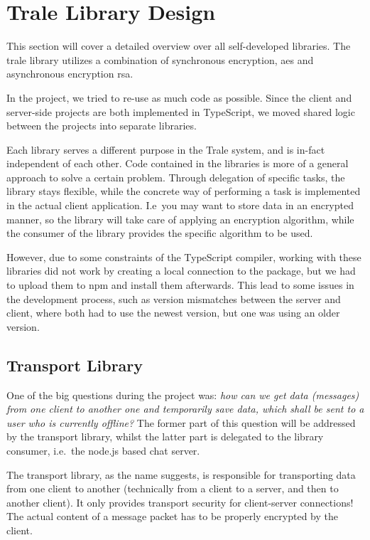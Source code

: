 \section{Trale Library Design}\label{sec:trale-library-design}

This section will cover a detailed overview over all self-developed libraries.
The trale library utilizes a combination of synchronous encryption, \ac{aes} and asynchronous encryption \ac{rsa}.

In the project, we tried to re-use as much code as possible.
Since the client and server-side projects are both implemented in TypeScript, we moved shared logic between the projects
into separate libraries.

Each library serves a different purpose in the Trale system, and is in-fact independent of each other.
Code contained in the libraries is more of a general approach to solve a certain problem.
Through delegation of specific tasks, the library stays flexible, while the concrete way of performing a task is
implemented in the actual client application.
I.e\ you may want to store data in an encrypted manner, so the library will take care of applying an encryption
algorithm, while the consumer of the library provides the specific algorithm to be used.

However, due to some constraints of the TypeScript compiler, working with these libraries did not work by creating a
local connection to the package, but we had to upload them to npm and install them afterwards.
This lead to some issues in the development process, such as version mismatches between the server and client, where
both had to use the newest version, but one was using an older version.

\subsection{Transport Library}\label{subsec:transport-library}

One of the big questions during the project was: \textit{how can we get data (messages) from one client to another one
and temporarily save data, which shall be sent to a user who is currently offline?}
The former part of this question will be addressed by the transport library, whilst the latter part is delegated to the
library consumer, i.e.\ the node.js based chat server.

The transport library, as the name suggests, is responsible for transporting data from one client to another
(technically from a client to a server, and then to another client).
It only provides transport security for client-server connections!
The actual content of a message packet has to be properly encrypted by the client.

